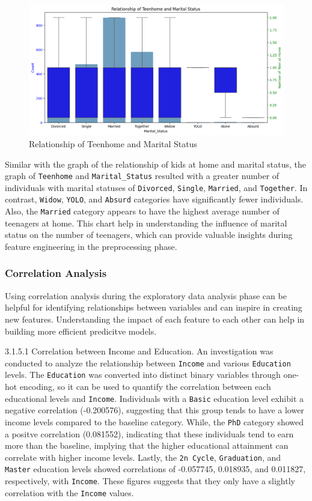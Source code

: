 \begin{figure}[H]
    \centering
    \includegraphics[width=\linewidth]{figures/teenhome_maritalstatus.png}
    \caption{Relationship of Teenhome and Marital Status}
\end{figure}

Similar with the graph of the relationship of kids at home and marital status, the graph of \texttt{Teenhome} and \texttt{Marital\_Status} resulted with a greater number of individuals with marital statuses of \texttt{Divorced}, \texttt{Single}, \texttt{Married}, and \texttt{Together}. In contrast, \texttt{Widow}, \texttt{YOLO}, and \texttt{Absurd} categories have significantly fewer individuals. Also, the \texttt{Married} category appears to have the highest average number of teenagers at home. This chart help in understanding the influence of marital status on the number of teenagers, which can provide valuable insights during feature engineering in the preprocessing phase.

\subsubsection{Correlation Analysis}

Using correlation analysis during the exploratory data analysis phase can be helpful for identifying relationships between variables and can inspire in creating new features. Understanding the impact of each feature to each other can help in building more efficient predicitve models.

    3.1.5.1 Correlation between Income and Education. An investigation was conducted to analyze the relationship between \texttt{Income} and various \texttt{Education} levels. The \texttt{Education} was converted into distinct binary variables through one-hot encoding, so it can be used to quantify the correlation between each educational levels and \texttt{Income}. Individuals with a \texttt{Basic} education level exhibit a negative correlation (-0.200576), suggesting that this group tends to have a lower income levels compared to the baseline category. While, the \texttt{PhD} category showed a positve correlation (0.081552), indicating that these individuals tend to earn more than the baseline, implying that the higher educational attainment can correlate with higher income levels. Lastly, the \texttt{2n Cycle}, \texttt{Graduation}, and \texttt{Master} education levels showed correlations of -0.057745, 0.018935, and 0.011827, respectively, with \texttt{Income}. These figures suggests that they only have a slightly correlation with the \texttt{Income} values.

